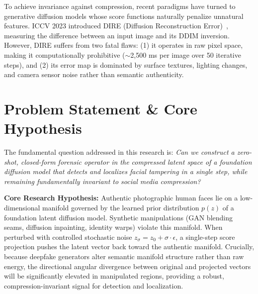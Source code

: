 \documentclass[12pt,a4paper]{report}
\begin{document}
To achieve invariance against compression, recent paradigms have turned to generative diffusion models whose score functions naturally penalize unnatural features. ICCV 2023 introduced DIRE (Diffusion Reconstruction Error)~\cite{wang2023dire}, measuring the difference between an input image and its DDIM inversion. However, DIRE suffers from two fatal flaws: (1) it operates in raw pixel space, making it computationally prohibitive ($\sim$2,500 ms per image over 50 iterative steps), and (2) its error map is dominated by surface textures, lighting changes, and camera sensor noise rather than semantic authenticity.

\section{Problem Statement \& Core Hypothesis}
The fundamental question addressed in this research is: \textit{Can we construct a zero-shot, closed-form forensic operator in the compressed latent space of a foundation diffusion model that detects and localizes facial tampering in a single step, while remaining fundamentally invariant to social media compression?}

\noindent\textbf{Core Research Hypothesis:} Authentic photographic human faces lie on a low-dimensional manifold governed by the learned prior distribution $p(z)$ of a foundation latent diffusion model. Synthetic manipulations (GAN blending seams, diffusion inpainting, identity warps) violate this manifold. When perturbed with controlled stochastic noise $z_\sigma = z_0 + \sigma \cdot \epsilon$, a single-step score projection pushes the latent vector back toward the authentic manifold. Crucially, because deepfake generators alter semantic manifold structure rather than raw energy, the directional angular divergence between original and projected vectors will be significantly elevated in manipulated regions, providing a robust, compression-invariant signal for detection and localization.
\end{document}
